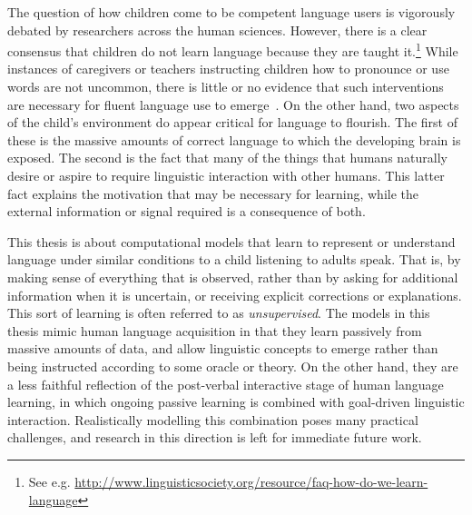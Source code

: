 
The question of how children come to be competent language users is vigorously debated by researchers across the human sciences. However, there is a clear consensus that children do not learn language because they are taught it.\footnote{See e.g. \scriptsize{\url{http://www.linguisticsociety.org/resource/faq-how-do-we-learn-language}}} While instances of caregivers or teachers instructing children how to pronounce or use words are not uncommon, there is little or no evidence that such interventions are necessary for fluent language use to emerge~\citep{tomasello2009constructing,pinker2009language}. On the other hand, two aspects of the child's environment do appear critical for language to flourish. The first of these is the massive amounts of correct language to which the developing brain is exposed. The second is the fact that many of the things that humans naturally desire or aspire to require linguistic interaction with other humans. This latter fact explains the motivation that may be necessary for learning, while the external information or signal required is a consequence of both. 

This thesis is about computational models that learn to represent or understand language under similar conditions to a child listening to adults speak. That is, by making sense of everything that is observed, rather than by asking for additional information when it is uncertain, or receiving explicit corrections or explanations. This sort of learning is often referred to as \emph{unsupervised}. The models in this thesis mimic human language acquisition in that they learn passively from massive amounts of data, and allow linguistic concepts to emerge rather than being instructed according to some oracle or theory. On the other hand, they are a less faithful reflection of the post-verbal interactive stage of human language learning, in which ongoing passive learning is combined with goal-driven linguistic interaction. Realistically modelling this combination poses many practical challenges, and research in this direction is left for immediate future work. 

